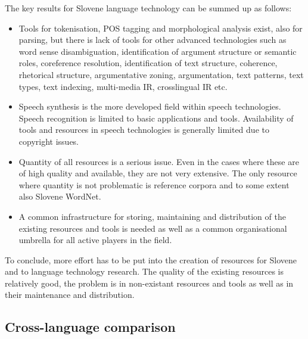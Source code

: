 \begin{multicols}{2}
The key results for Slovene language technology can be summed up as follows:

\begin{itemize}
\item Tools for tokenisation, POS tagging and morphological analysis exist, also for parsing, but there is lack of tools for other advanced technologies such as word sense disambiguation, identification of argument structure or semantic roles, coreference resolution, identification of text structure, coherence, rhetorical structure, argumentative zoning, argumentation, text patterns, text types, text indexing, multi-media IR, crosslingual IR etc. 
\item Speech synthesis is the more developed field within speech technologies. Speech recognition is limited to basic applications and tools. Availability of tools and resources in speech technologies is generally limited due to copyright issues. 
\item Quantity of all resources is a serious issue. Even in the cases where these are of high quality and available, they are not very extensive. The only resource where quantity is not problematic is reference corpora and to some extent also Slovene WordNet. 
\item A common infrastructure for storing, maintaining and distribution of the existing resources and tools is needed as well as a common organisational umbrella for all active players in the field. 
\end{itemize}

To conclude, more effort has to be put into the creation of resources for Slovene and to language technology research. The quality of the existing resources is relatively good, the problem is in non-existant resources and tools as well as in their maintenance and distribution.

\subsection{Cross-language comparison}


\end{multicols}
